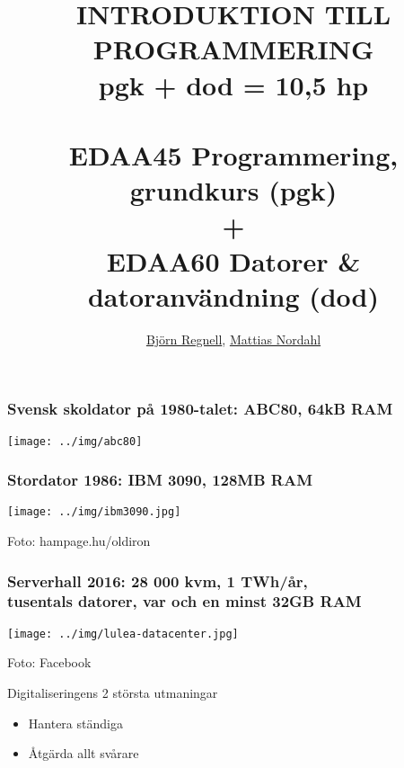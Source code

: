 \documentclass{lecturesimple}
\title[Kort presentation av pgk \& dod, \DateOfShow]{
INTRODUKTION TILL PROGRAMMERING\\ pgk + dod = 10,5 hp \\ ~ \\  
\textbf{EDAA45} Programmering, grundkurs (pgk) \\ + \\ \textbf{EDAA60} Datorer \& datoranvändning (dod)}
\author{\href{http://cs.lth.se/bjorn-regnell}{Björn Regnell}, \href{https://cs.lth.se/nordahl-mattias/}{Mattias Nordahl}}
\institute{\href{http://cs.lth.se}{Datavetenskap}, LTH}
\date{\DateOfShow}
\begin{document}
\frame{\titlepage}

\begin{frame}\frametitle{Svensk skoldator på 1980-talet: ABC80, 64kB RAM}
  \begin{center}
      \texttt{[image: ../img/abc80]}
  \end{center}
  \end{frame}
  
  
  \begin{frame}\frametitle{Stordator 1986: IBM 3090, %
      128MB RAM}
  \begin{center}
      \texttt{[image: ../img/ibm3090.jpg]}
    
      {\fontsize{5}{5}\selectfont\color{gray}
      Foto: hampage.hu/oldiron
    }
  \end{center}
  \end{frame}
    
  \begin{frame}\frametitle{Serverhall 2016: 28 000 kvm, 1 TWh/år, \\tusentals datorer, var och en minst 32GB RAM}
    \begin{center}
      \texttt{[image: ../img/lulea-datacenter.jpg]}
    
      {\fontsize{5}{5}\selectfont\color{gray}
    Foto: Facebook
    }
    \end{center}
  \end{frame}
  


\begin{Slide}{Digitaliseringens 2 största utmaningar}
  \begin{itemize}\Large
    \item Hantera ständiga 
    \item Åtgärda allt svårare  
  \end{itemize}  
\end{Slide}


\end{document}
